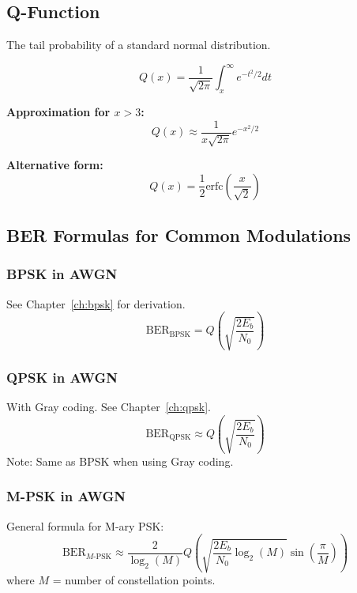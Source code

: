 \subsection{Q-Function}
\label{sec:q-function}

The tail probability of a standard normal distribution.

\begin{equation}
Q(x) = \frac{1}{\sqrt{2\pi}} \int_x^\infty e^{-t^2/2} dt
\label{eq:q-function}
\end{equation}

\textbf{Approximation for $x > 3$:}
\begin{equation}
Q(x) \approx \frac{1}{x\sqrt{2\pi}} e^{-x^2/2}
\label{eq:q-approx}
\end{equation}

\textbf{Alternative form:}
\begin{equation}
Q(x) = \frac{1}{2}\text{erfc}\left(\frac{x}{\sqrt{2}}\right)
\label{eq:q-erfc}
\end{equation}

\subsection{BER Formulas for Common Modulations}

\subsubsection{BPSK in AWGN}
See Chapter~\ref{ch:bpsk} for derivation.
\begin{equation}
\text{BER}_{\text{BPSK}} = Q\left(\sqrt{\frac{2E_b}{N_0}}\right)
\label{eq:ber-bpsk}
\end{equation}

\subsubsection{QPSK in AWGN}
With Gray coding. See Chapter~\ref{ch:qpsk}.
\begin{equation}
\text{BER}_{\text{QPSK}} \approx Q\left(\sqrt{\frac{2E_b}{N_0}}\right)
\label{eq:ber-qpsk}
\end{equation}
Note: Same as BPSK when using Gray coding.

\subsubsection{M-PSK in AWGN}
General formula for M-ary PSK:
\begin{equation}
\text{BER}_{M\text{-PSK}} \approx \frac{2}{\log_2(M)} Q\left(\sqrt{\frac{2E_b}{N_0}\log_2(M)} \sin\left(\frac{\pi}{M}\right)\right)
\label{eq:ber-mpsk}
\end{equation}
where $M$ = number of constellation points.

